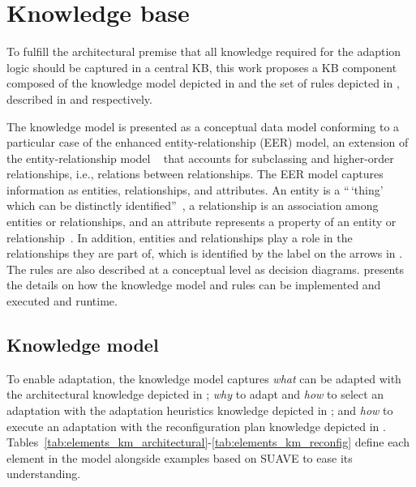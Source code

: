 \section{Knowledge base}\label{sec:rosa:kb}
To fulfill the architectural premise that all knowledge required for the adaption logic should be captured in a central KB, this work proposes a KB component composed of the knowledge model depicted in   and the set of rules depicted in , described in  and  respectively.

The knowledge model is presented as a conceptual data model conforming to a particular case of the enhanced entity-relationship (EER)\mbox{\cite{herm, thalheim2013entity}} model, an extension of the entity-relationship model \mbox{~\cite{chen1976entity}} that accounts for subclassing and higher-order relationships, i.e., relations between relationships. The EER model captures information as entities, relationships, and attributes. An entity is a ``\,`thing' which can be distinctly identified''\mbox{~\cite{chen1976entity}}, a relationship is an association among entities or relationships, and an attribute represents a property of an entity or relationship\mbox{~\cite{herm, thalheim2013entity}}. In addition, entities and relationships play a role in the relationships they are part of, which is identified by the label on the arrows in \mbox{}. The rules are also described at a conceptual level as decision diagrams. \mbox{} presents the details on how the knowledge model and rules can be implemented and executed and runtime. %


\subsection{Knowledge model}\label{sec:rosa:kb_model}
To enable adaptation, the knowledge model captures
\emph{what} can be adapted with the architectural knowledge depicted in ; \emph{why} to adapt and \emph{how} to select an adaptation with the adaptation heuristics knowledge depicted in ; and \emph{how} to execute an adaptation with the reconfiguration plan knowledge depicted in . Tables~\ref{tab:elements_km_architectural}-\ref{tab:elements_km_reconfig} define each element in the model alongside examples based on SUAVE to ease its understanding.

